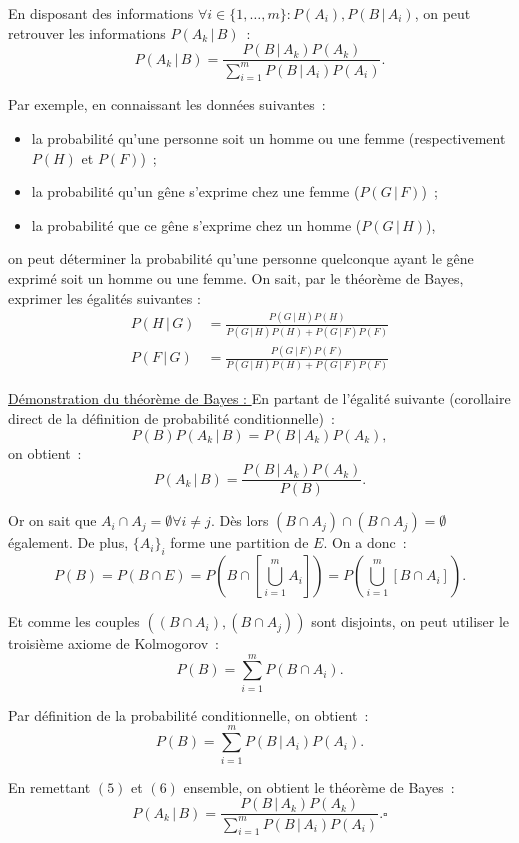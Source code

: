 \documentclass{article}
\begin{document}
		En disposant des informations $\forall i \in \{1, \ldots, m\} : P(A_i), P(B \, | \, A_i)$, on peut retrouver les informations $P(A_k \, | \, B)$~:
		\[P(A_k \, | \, B) = \frac {P(B \, | \, A_k)P(A_k)}{\sum_{i=1}^mP(B \, | \, A_i)P(A_i)}.\]

		Par exemple, en connaissant les données suivantes~:
		\begin{itemize}
			\item la probabilité qu'une personne soit un homme ou une femme (respectivement $P(H)$ et $P(F)$)~;
			\item la probabilité qu'un gêne s'exprime chez une femme ($P(G \, | \, F)$)~;
			\item la probabilité que ce gêne s'exprime chez un homme ($P(G \, | \, H)$),
		\end{itemize}
		on peut déterminer la probabilité qu'une personne quelconque ayant le gêne exprimé soit un homme ou une femme. On sait, par le théorème de Bayes, exprimer les
		égalités suivantes :
		\begin{align*}
			P(H \, | \, G) &= \frac {P(G \, | \, H)P(H)}{P(G \, | \, H)P(H) + P(G \, | \, F)P(F)} \\
			P(F \, | \, G) &= \frac {P(G \, | \, F)P(F)}{P(G \, | \, H)P(H) + P(G \, | \, F)P(F)}
		\end{align*}

		\underline{Démonstration du théorème de Bayes : } En partant de l'égalité suivante (corollaire direct de la définition de probabilité conditionnelle)~:
		\[P(B)P(A_k \, | \, B) = P(B \, | \, A_k)P(A_k),\]
		on obtient~:
		\[P(A_k \, | \, B) = \frac {P(B \, | \, A_k)P(A_k)}{P(B)}.\]

		Or on sait que $A_i \cap A_j = \emptyset \forall i \neq j$. Dès lors $(B \cap A_j) \cap (B \cap A_j) = \emptyset$ également. De plus, $\{A_i\}_i$ forme une
		partition de $E$. On a donc~:
		\[P(B) = P(B \cap E) = P\left(B \cap \left[\bigcup_{i=1}^mA_i\right]\right) = P\left(\bigcup_{i=1}^m[B \cap A_i]\right).\]

		Et comme les couples $((B \cap A_i), (B \cap A_j))$ sont disjoints, on peut utiliser le troisième axiome de Kolmogorov~:
		\[P(B) = \sum_{i=1}^mP(B \cap A_i).\]

		Par définition de la probabilité conditionnelle, on obtient~:
		\[P(B) = \sum_{i=1}^mP(B \, | \, A_i)P(A_i).\]

		En remettant $(5)$ et $(6)$ ensemble, on obtient le théorème de Bayes~:
		\[P(A_k \, | \, B) = \frac {P(B \, | \, A_k)P(A_k)}{\sum_{i=1}^mP(B \, | \, A_i)P(A_i)}. \square\]
\end{document}
